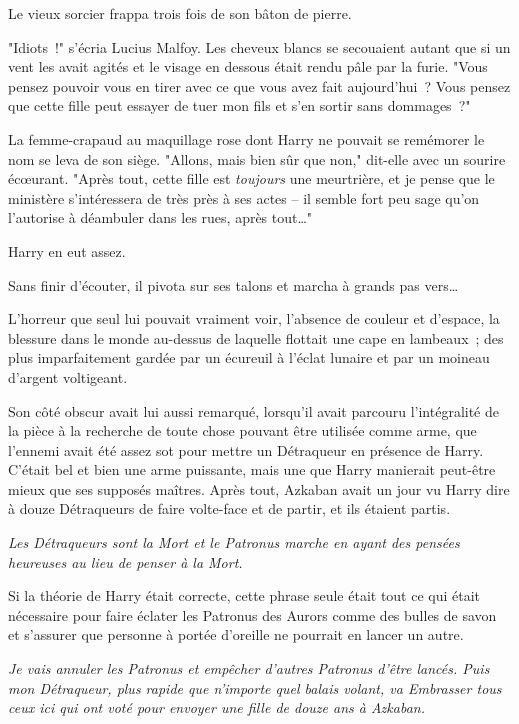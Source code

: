 Le vieux sorcier frappa trois fois de son bâton de pierre.

"Idiots~!" s'écria Lucius Malfoy. Les cheveux blancs se secouaient autant que si un vent les avait agités et le visage en dessous était rendu pâle par la furie. "Vous pensez pouvoir vous en tirer avec ce que vous avez fait aujourd'hui~? Vous pensez que cette fille peut essayer de tuer mon fils et s'en sortir sans dommages~?"

La femme-crapaud au maquillage rose dont Harry ne pouvait se remémorer le nom se leva de son siège. "Allons, mais bien sûr que non," dit-elle avec un sourire écœurant. "Après tout, cette fille est \emph{toujours} une meurtrière, et je pense que le ministère s'intéressera de très près à ses actes -- il semble fort peu sage qu'on l'autorise à déambuler dans les rues, après tout…"

Harry en eut assez.

Sans finir d'écouter, il pivota sur ses talons et marcha à grands pas vers…

L'horreur que seul lui pouvait vraiment voir, l'absence de couleur et d'espace, la blessure dans le monde au-dessus de laquelle flottait une cape en lambeaux~; des plus imparfaitement gardée par un écureuil à l'éclat lunaire et par un moineau d'argent voltigeant.

Son côté obscur avait lui aussi remarqué, lorsqu'il avait parcouru l'intégralité de la pièce à la recherche de toute chose pouvant être utilisée comme arme, que l'ennemi avait été assez sot pour mettre un Détraqueur en présence de Harry. C'était bel et bien une arme puissante, mais une que Harry manierait peut-être mieux que ses supposés maîtres. Après tout, Azkaban avait un jour vu Harry dire à douze Détraqueurs de faire volte-face et de partir, et ils étaient partis.

\emph{Les Détraqueurs sont la Mort et le Patronus marche en ayant des pensées heureuses au lieu de penser à la Mort.}

Si la théorie de Harry était correcte, cette phrase seule était tout ce qui était nécessaire pour faire éclater les Patronus des Aurors comme des bulles de savon et s'assurer que personne à portée d'oreille ne pourrait en lancer un autre.

\emph{Je vais annuler les Patronus et empêcher d'autres Patronus d'être lancés. Puis mon Détraqueur, plus rapide que n'importe quel balais volant, va Embrasser tous ceux ici qui ont voté pour envoyer une fille de douze ans à Azkaban.}

